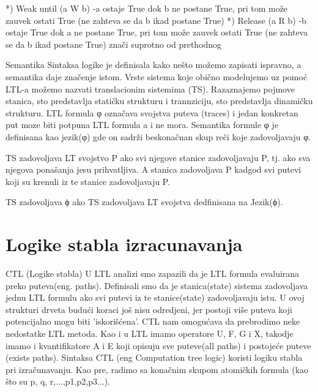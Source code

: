 \documentclass[a4paper]{article}
\begin{document}
{	*) Weak until (a W b) \newline
		-a ostaje True dok b ne postane True, pri tom može zauvek ostati True (ne zahteva se da b ikad postane True) \newline
	*) Release (a R b) \newline
		-b ostaje True dok a ne postane True, pri tom može zauvek ostati True (ne zahteva se da b ikad postane True) znači suprotno od prethodnog \newline

	Semantika
	\newline
	\newline
	Sintaksa logike je definisala kako nešto možemo zapisati ispravno, a semantika daje značenje istom.
	Vrste sistema koje obično modelujemo uz pomoć LTL-a možemo nazvati translacionim sistemima (TS). Razaznajemo pojmove stanica, sto predstavlja statičku strukturu i trannziciju, sto predstavlja dinamičku strukturu.
	LTL formula φ označava svojstva puteva (traces) i jedan konkretan put moze biti potpuna LTL formula a i ne mora.
	Semantika formule φ je definisana kao jezik(φ) gde on sadrži beskonačnan skup reči koje zadovoljavaju φ.

	TS zadovoljava LT svojstvo P ako svi njegove stanice zadovoljavaju P, tj. ako sva njegova ponašanja jesu prihvatljiva. A stanica zadovoljava P kadgod svi putevi koji su krenuli iz te stanice zadovoljavaju P.

	TS zadovoljava ϕ ako TS zadovoljava LT svojstva dedfinisana na Jezik(ϕ).
	}

	\section{Logike stabla izracunavanja}
	\label{sec:CTL}

	CTL (Logike stabla)
	\newline
	\newline
	U LTL analizi smo zapazili da je LTL formula evaluirana preko puteva(eng. paths). Definisali smo da je stanica(state) sistema
	zadovoljava jednu LTL formulu ako svi putevi iz te stanice(state) zadovoljavaju istu. U ovoj strukturi drveta budući koraci još nisu
	odredjeni, jer postoji više puteva koji potencijalno mogu biti 'iskorišćena'.
	CTL nam omogućava da prebrodimo neke nedostatke LTL metoda. Kao i u LTL imamo operatore U, F, G i X, takodje imamo i kvantifikatore
	A i E koji opisuju sve puteve(all paths) i postojeće puteve (exists paths). 
	\newline
	\newline
	Sintaksa
	\newline
	\newline
	CTL (eng Computation tree logic) koristi logiku stabla pri izračunavanju. 
	Kao pre, radimo sa konačnim skupom atomičkih formula (kao što su p, q, r,...,p1,p2,p3...).
\end{document}
